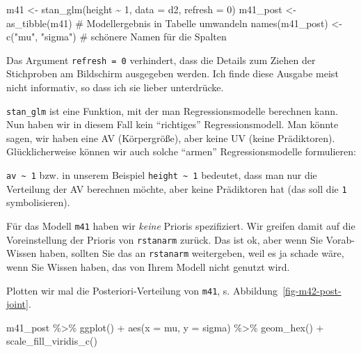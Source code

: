 \documentclass[
  a4paper,
  DIV=11]{scrreprt}
\newenvironment{Shaded}{\begin{snugshade}}{\end{snugshade}}
\newcommand{\AttributeTok}[1]{\textcolor[rgb]{0.40,0.45,0.13}{#1}}
\newcommand{\CommentTok}[1]{\textcolor[rgb]{0.37,0.37,0.37}{#1}}
\newcommand{\DecValTok}[1]{\textcolor[rgb]{0.68,0.00,0.00}{#1}}
\newcommand{\FunctionTok}[1]{\textcolor[rgb]{0.28,0.35,0.67}{#1}}
\newcommand{\NormalTok}[1]{\textcolor[rgb]{0.00,0.23,0.31}{#1}}
\newcommand{\OtherTok}[1]{\textcolor[rgb]{0.00,0.23,0.31}{#1}}
\newcommand{\SpecialCharTok}[1]{\textcolor[rgb]{0.37,0.37,0.37}{#1}}
\newcommand{\StringTok}[1]{\textcolor[rgb]{0.13,0.47,0.30}{#1}}
\theoremstyle{definition}
\theoremstyle{remark}
\begin{document}
\begin{Shaded}
\begin{Highlighting}[]
\NormalTok{m41 }\OtherTok{\textless{}{-}} \FunctionTok{stan\_glm}\NormalTok{(height }\SpecialCharTok{\textasciitilde{}} \DecValTok{1}\NormalTok{, }\AttributeTok{data =}\NormalTok{ d2, }\AttributeTok{refresh =} \DecValTok{0}\NormalTok{)}
\NormalTok{m41\_post }\OtherTok{\textless{}{-}} \FunctionTok{as\_tibble}\NormalTok{(m41)  }\CommentTok{\# Modellergebnis in Tabelle umwandeln}
\FunctionTok{names}\NormalTok{(m41\_post) }\OtherTok{\textless{}{-}} \FunctionTok{c}\NormalTok{(}\StringTok{"mu"}\NormalTok{, }\StringTok{"sigma"}\NormalTok{)  }\CommentTok{\# schönere Namen für die Spalten}
\end{Highlighting}
\end{Shaded}

Das Argument \texttt{refresh\ =\ 0} verhindert, dass die Details zum
Ziehen der Stichproben am Bildschirm ausgegeben werden. Ich finde diese
Ausgabe meist nicht informativ, so dass ich sie lieber unterdrücke.

\texttt{stan\_glm} ist eine Funktion, mit der man Regressionsmodelle
berechnen kann. Nun haben wir in diesem Fall kein ``richtiges''
Regressionsmodell. Man könnte sagen, wir haben eine AV (Körpergröße),
aber keine UV (keine Prädiktoren). Glücklicherweise können wir auch
solche ``armen'' Regressionsmodelle formulieren:

\texttt{av\ \textasciitilde{}\ 1} bzw. in unserem Beispiel
\texttt{height\ \textasciitilde{}\ 1} bedeutet, dass man nur die
Verteilung der AV berechnen möchte, aber keine Prädiktoren hat (das soll
die \texttt{1} symbolisieren).

Für das Modell \texttt{m41} haben wir \emph{keine} Prioris spezifiziert.
Wir greifen damit auf die Voreinstellung der Prioris von
\texttt{rstanarm} zurück. Das ist ok, aber wenn Sie Vorab-Wissen haben,
sollten Sie das an \texttt{rstanarm} weitergeben, weil es ja schade
wäre, wenn Sie Wissen haben, das von Ihrem Modell nicht genutzt wird.

Plotten wir mal die Posteriori-Verteilung von \texttt{m41}, s.
Abbildung~\ref{fig-m42-post-joint}.

\begin{Shaded}
\begin{Highlighting}[]
\NormalTok{m41\_post }\SpecialCharTok{\%\textgreater{}\%} 
  \FunctionTok{ggplot}\NormalTok{() }\SpecialCharTok{+}
  \FunctionTok{aes}\NormalTok{(}\AttributeTok{x =}\NormalTok{ mu, }\AttributeTok{y =}\NormalTok{ sigma) }\SpecialCharTok{\%\textgreater{}\%} 
  \FunctionTok{geom\_hex}\NormalTok{() }\SpecialCharTok{+}
  \FunctionTok{scale\_fill\_viridis\_c}\NormalTok{() }
\end{Highlighting}
\end{Shaded}
\end{document}

